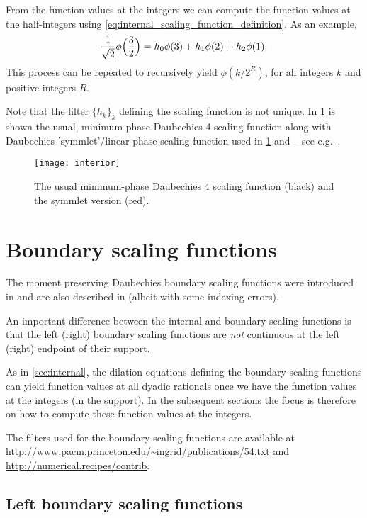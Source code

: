 \documentclass[a4paper]{scrartcl}
\begin{document}
From the function values at the integers we can compute the function values at the half-integers using \eqref{eq:internal_scaling_function_definition}.
As an example,
\begin{equation*}
	\frac1{\sqrt2} \phi\Bigl(\frac32\Bigr)
	= h_0 \phi(3) + h_1 \phi(2) + h_2 \phi(1).
\end{equation*}
This process can be repeated to recursively yield $\phi(k/2^R)$, for all integers $k$ and positive integers $R$.

Note that the filter $\{h_k\}_k$ defining the scaling function is not unique.
In \cref{fig:Daubechies4} is shown the usual, minimum-phase Daubechies 4 scaling function along with Daubechies 'symmlet'/linear phase scaling function used in \cref{sec:boundary_Daubechies} and \cite{Cohen:Daubechies:Vial:1993} -- see e.g.\ \cite[Section 7.2.3]{Mallat:2009}.

\begin{figure}
	\centering
	\texttt{[image: interior]}
	\caption{The usual minimum-phase Daubechies 4 scaling function (black) and the symmlet version (red).}
	\label{fig:Daubechies4}
\end{figure}


\section{Boundary scaling functions}
\label{sec:boundary_Daubechies}

The moment preserving Daubechies boundary scaling functions were introduced in \cite{Cohen:Daubechies:Vial:1993} and are also described in \cite{Mallat:2009} (albeit with some indexing errors).

An important difference between the internal and boundary scaling functions is that the left (right) boundary scaling functions are \emph{not} continuous at the left (right) endpoint of their support.

As in \cref{sec:internal}, the dilation equations defining the boundary scaling functions can yield function values at all dyadic rationals once we have the function values at the integers (in the support).
In the subsequent sections the focus is therefore on how to compute these function values at the integers.

The filters used for the boundary scaling functions are available at \url{http://www.pacm.princeton.edu/~ingrid/publications/54.txt} and \url{http://numerical.recipes/contrib}.


\subsection{Left boundary scaling functions}
\end{document}
